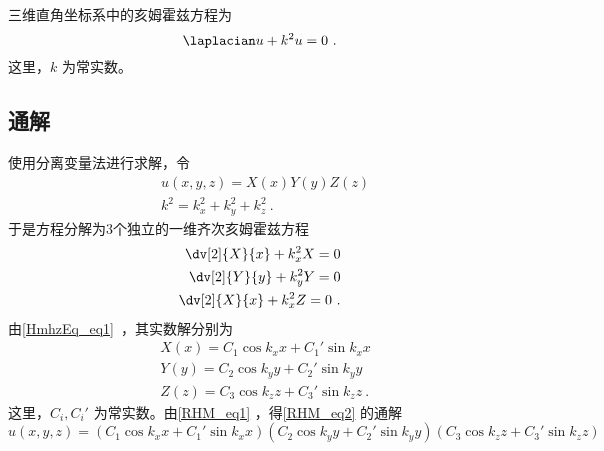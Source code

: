 

三维直角坐标系中的亥姆霍兹方程为
\begin{equation}\label{RHM_eq2}
\laplacian u+k^2u=0~.
\end{equation}
这里，$k$ 为常实数。
\subsection{通解}
使用分离变量法进行求解，令
\begin{equation}\label{RHM_eq1}
\begin{aligned}
&u(x,y,z)=X(x)Y(y)Z(z)\\
&k^2=k_x^2+k_y^2+k_z^2~.
\end{aligned}
\end{equation}
于是方程分解为3个独立的一维齐次亥姆霍兹方程
\begin{equation}
\begin{aligned}
\dv[2]{X}{x}+k_x^2X=0\\
\dv[2]{Y}{y}+k_y^2Y=0\\
\dv[2]{X}{x}+k_x^2Z=0~.
\end{aligned}
\end{equation}
由\autoref{HmhzEq_eq1}~，其实数解分别为
\begin{equation}
\begin{aligned}
&X(x)=C_1\cos k_xx+C_1'\sin k_xx\\
&Y(y)=C_2\cos k_yy+C_2'\sin k_yy\\
&Z(z)=C_3\cos k_zz+C_3'\sin k_zz~.
\end{aligned}
\end{equation}
这里，$C_i,C_i'$ 为常实数。由\autoref{RHM_eq1} ，得\autoref{RHM_eq2} 的通解
\begin{equation}\label{RHM_eq3}
u(x,y,z)=(C_1\cos k_xx+C_1'\sin k_xx)(C_2\cos k_yy+C_2'\sin k_yy)(C_3\cos k_zz+C_3'\sin k_zz)
\end{equation}
